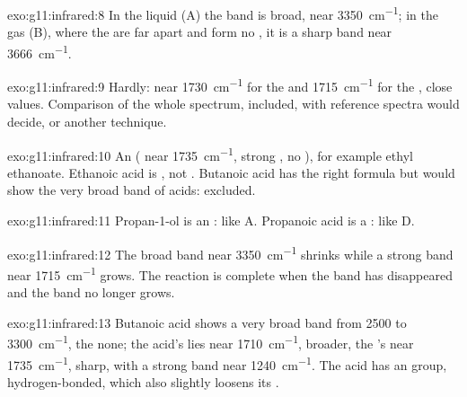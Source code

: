 \begin{solution}{exo:g11:infrared:8}
In the liquid (A) the  band is broad, near
\qty{3350}{cm^{-1}}; in the gas (B), where the  are far apart
and form no , it is a sharp band near
\qty{3666}{cm^{-1}}.
\end{solution}

\begin{solution}{exo:g11:infrared:9}
Hardly: near \qty{1730}{cm^{-1}} for the  and
\qty{1715}{cm^{-1}} for the , close values. Comparison of the
whole spectrum,  included, with reference spectra
would decide, or another technique.
\end{solution}

\begin{solution}{exo:g11:infrared:10}
An  ( near \qty{1735}{cm^{-1}}, strong , no
), for example ethyl ethanoate. Ethanoic acid is , not
. Butanoic acid has the right formula but would show the very
broad  band of acids: excluded.
\end{solution}

\begin{solution}{exo:g11:infrared:11}
Propan-1-ol is an : like A. Propanoic acid is a :
like D.
\end{solution}

\begin{solution}{exo:g11:infrared:12}
The broad  band near \qty{3350}{cm^{-1}} shrinks while a strong
 band near \qty{1715}{cm^{-1}} grows. The reaction is complete
when the  band has disappeared and the  band no longer
grows.
\end{solution}

\begin{solution}{exo:g11:infrared:13}
Butanoic acid shows a very broad  band from 2500 to
\qty{3300}{cm^{-1}}, the  none; the acid's  lies near
\qty{1710}{cm^{-1}}, broader, the 's near \qty{1735}{cm^{-1}},
sharp, with a strong  band near \qty{1240}{cm^{-1}}. The acid has
an  group, hydrogen-bonded, which also slightly loosens its
.
\end{solution}

